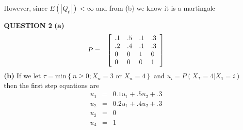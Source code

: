 \documentclass{amsart}
\theoremstyle{definition}
\theoremstyle{remark}
\numberwithin{equation}{section}
\begin{document}
However, since $E(|Q_t|)< \infty$ and from (b) we know it is a martingale
\bigskip

{\bf QUESTION 2}
\newline
{\bf (a)}
\newline
\begin{eqnarray}
\nonumber P&=&\left[
\begin{array}[4]{llll}
.1 & .5 & .1 & .3  \\
.2 & .4 & .1 & .3  \\
0 & 0 & 1 & 0 \\
0 & 0 & 0& 1 \\
\end{array}
\right]
\end{eqnarray}
\newline
{\bf (b)}
\newline
If we let $\tau=\text{min}\left\{ n \ge 0; X_n=3 \text{ or } X_n=4 \right\}$ and $u_i=P(X_T=4 | X_1=i)$ then the first step equations are
\begin{eqnarray}
\nonumber u_1&=&0.1u_1+.5u_2+.3 \\
\nonumber u_2&=&0.2u_1+.4u_2+.3 \\
\nonumber u_3&=&0 \\
\nonumber u_4&=&1
\end{eqnarray}
\bigskip
\end{document}
